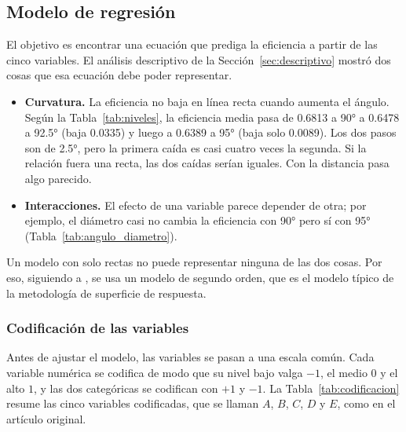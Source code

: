 \subsection{Modelo de regresión}
\label{sec:modelo}

El objetivo es encontrar una ecuación que prediga la eficiencia a partir de las cinco variables. El análisis descriptivo de la Sección~\ref{sec:descriptivo} mostró dos cosas que esa ecuación debe poder representar.

\begin{itemize}
  \item \textbf{Curvatura.} La eficiencia no baja en línea recta cuando aumenta el ángulo. Según la Tabla~\ref{tab:niveles}, la eficiencia media pasa de 0.6813 a 90° a 0.6478 a 92.5° (baja 0.0335) y luego a 0.6389 a 95° (baja solo 0.0089). Los dos pasos son de 2.5°, pero la primera caída es casi cuatro veces la segunda. Si la relación fuera una recta, las dos caídas serían iguales. Con la distancia pasa algo parecido.
  \item \textbf{Interacciones.} El efecto de una variable parece depender de otra; por ejemplo, el diámetro casi no cambia la eficiencia con 90° pero sí con 95° (Tabla~\ref{tab:angulo_diametro}).
\end{itemize}

Un modelo con solo rectas no puede representar ninguna de las dos cosas. Por eso, siguiendo a \citet{Lakdawala2025}, se usa un modelo de segundo orden, que es el modelo típico de la metodología de superficie de respuesta.

\subsubsection{Codificación de las variables}

Antes de ajustar el modelo, las variables se pasan a una escala común. Cada variable numérica se codifica de modo que su nivel bajo valga $-1$, el medio $0$ y el alto $1$, y las dos categóricas se codifican con $+1$ y $-1$. La Tabla~\ref{tab:codificacion} resume las cinco variables codificadas, que se llaman $A$, $B$, $C$, $D$ y $E$, como en el artículo original.

